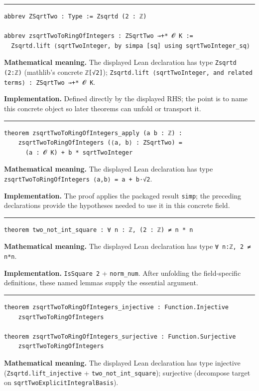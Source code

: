 \documentclass[UTF8,a4paper,11pt,fontset=fandol]{ctexart}
\theoremstyle{definition}
\newcommand{\statementsep}{\par\medskip\hrule\medskip}
\begin{document}
\statementsep
\begin{verbatim}
abbrev ZSqrtTwo : Type := Zsqrtd (2 : ℤ)

abbrev zsqrtTwoToRingOfIntegers : ZSqrtTwo →+* 𝓞 K :=
  Zsqrtd.lift ⟨sqrtTwoInteger, by simpa [sq] using sqrtTwoInteger_sq⟩
\end{verbatim}
\noindent\textbf{Mathematical meaning.} The displayed Lean declaration has type \texttt{Zsqrtd (2:ℤ)} (mathlib's concrete \texttt{ℤ[√2]}); \texttt{Zsqrtd.\allowbreak{}lift ⟨sqrtTwoInteger, and related terms⟩ : ZSqrtTwo →+* 𝓞 K}.\par
\noindent\textbf{Implementation.} Defined directly by the displayed RHS; the point is to name this concrete object so later theorems can unfold or transport it.\par
\statementsep
\begin{verbatim}
theorem zsqrtTwoToRingOfIntegers_apply (a b : ℤ) :
    zsqrtTwoToRingOfIntegers (⟨a, b⟩ : ZSqrtTwo) =
      (a : 𝓞 K) + b * sqrtTwoInteger
\end{verbatim}
\noindent\textbf{Mathematical meaning.} The displayed Lean declaration has type \texttt{zsqrtTwoToRingOfIntegers ⟨a,b⟩ = a + b·√2}.\par
\noindent\textbf{Implementation.} The proof applies the packaged result \texttt{simp}; the preceding declarations provide the hypotheses needed to use it in this concrete field.\par
\statementsep
\begin{verbatim}
theorem two_not_int_square : ∀ n : ℤ, (2 : ℤ) ≠ n * n
\end{verbatim}
\noindent\textbf{Mathematical meaning.} The displayed Lean declaration has type \texttt{∀ n:ℤ, 2 ≠ n*n}.\par
\noindent\textbf{Implementation.} \texttt{IsSquare 2} + \texttt{norm\_\allowbreak{}num}. After unfolding the field-specific definitions, these named lemmas supply the essential argument.\par
\statementsep
\begin{verbatim}
theorem zsqrtTwoToRingOfIntegers_injective : Function.Injective
    zsqrtTwoToRingOfIntegers

theorem zsqrtTwoToRingOfIntegers_surjective : Function.Surjective
    zsqrtTwoToRingOfIntegers
\end{verbatim}
\noindent\textbf{Mathematical meaning.} The displayed Lean declaration has type injective (\texttt{Zsqrtd.\allowbreak{}lift\_\allowbreak{}injective} + \texttt{two\_\allowbreak{}not\_\allowbreak{}int\_\allowbreak{}square}); surjective (decompose target on \texttt{sqrtTwoExplicitIntegralBasis}).\par
\end{document}
